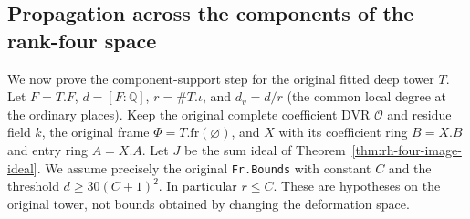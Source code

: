 \subsection{Propagation across the components of the rank-four space}
\label{subsec:rh-four-component-propagation}

We now prove the component-support step for the original fitted deep
tower $T$. Let $F=T.F$, $d=[F:\mathbb Q]$, $r=\#T.\iota$, and
$d_v=d/r$ (the common local degree at the ordinary places).
Keep the original complete coefficient DVR $\mathcal O$ and
residue field $k$, the original frame $\Phi=T.\mathrm{fr}(\varnothing)$,
and $X$ with its coefficient ring $B=X.B$ and entry ring $A=X.A$.
Let $J$ be the sum ideal of Theorem~\ref{thm:rh-four-image-ideal}.
We assume precisely the original \texttt{Fr.Bounds} with constant
$C$ and the threshold $d\geq30(C+1)^2$. In particular $r\leq C$.
These are hypotheses on the original tower, not bounds obtained
by changing the deformation space.

